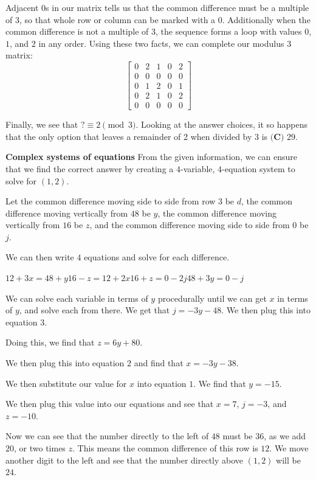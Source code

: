 \begin{enumerate}
 Adjacent $0$s in our matrix tells us that the common difference must be a multiple of 3, so that whole row or column can be marked with a $0$. Additionally when the common difference is not a multiple of 3, the sequence forms a loop with values $0$, $1$, and $2$ in any order. Using these two facts, we can complete our modulus 3 matrix:
 \[\begin{bmatrix} 0 & 2 &1&0&2 \\ 0&0&0&0&0\\ 0&1&2&0&1\\ 0&2&1&0&2\\ 0&0&0&0&0\end{bmatrix}\]

 Finally, we see that $? \equiv 2 \pmod{3}$. Looking at the answer choices, it so happens that the only option that leaves a remainder of 2 when divided by 3 is $\boxed{\textbf{(C) } 29}$.

 \textbf{Complex systems of equations} From the given information, we can ensure that we find the correct answer by creating a $4$-variable, $4$-equation system to solve for $(1,2)$.

 Let the common difference moving side to side from row $3$ be $d$, the common difference moving vertically from $48$ be $y$, the common difference moving vertically from $16$ be $z$, and the common difference moving side to side from $0$ be $j$.

 We can then write $4$ equations and solve for each difference.

 $12+3x=48+y$$16-z=12+2x$$16+z=0-2j$$48+3y=0-j$

 We can solve each variable in terms of $y$ procedurally until we can get $x$ in terms of $y$, and solve each from there. We get that $j=-3y-48$. We then plug this into equation $3$.

 Doing this, we find that $z=6y+80$.

 We then plug this into equation $2$ and find that $x=-3y-38$.

 We then substitute our value for $x$ into equation $1$. We find that $y=-15$.

 We then plug this value into our equations and see that $x=7$, $j=-3$, and $z=-10$.

 Now we can see that the number directly to the left of $48$ must be $36$, as we add $20$, or two times $z$. This means the common difference of this row is $12$. We move another digit to the left and see that the number directly above $(1,2)$ will be $24$. 


\end{enumerate}
